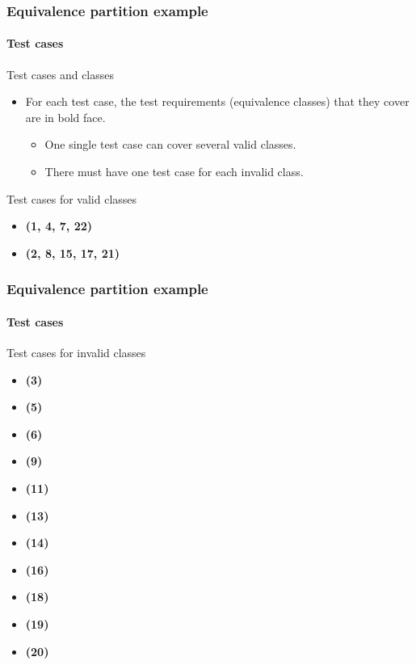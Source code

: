 \begin{frame}
\frametitle{Equivalence partition example}
\framesubtitle{Test cases}

\begin{block}{Test cases and classes}
\begin{itemize}
	\item For each test case, the test requirements (equivalence classes) that
	they cover are in bold face.
	\begin{itemize}
		\item One single test case can cover several valid classes.

		\item There must have one test case for each invalid class.
	\end{itemize}
\end{itemize}
\end{block}


\begin{block}{Test cases for valid classes}
\begin{itemize}
	\item {} \textbf{(1, 4, 7, 22)}
	\item {} \textbf{(2, 8, 15, 17, 21)}
\end{itemize}
\end{block}
\end{frame}


\begin{frame}[hasprev=true, hasnext=false]
\frametitle{Equivalence partition example}
\framesubtitle{Test cases}

\begin{block}{Test cases for invalid classes}
\begin{itemize}
	\item {} \textbf{(3)}
	\item {} \textbf{(5)}
	\item {} \textbf{(6)}
	\item {} \textbf{(9)}
	\item {} \textbf{(11)}
	\item {} \textbf{(13)}
	\item {} \textbf{(14)}
	\item {} \textbf{(16)}
	\item {} \textbf{(18)}
	\item {} \textbf{(19)}
	\item {} \textbf{(20)}
\end{itemize}
\end{block}
\end{frame}